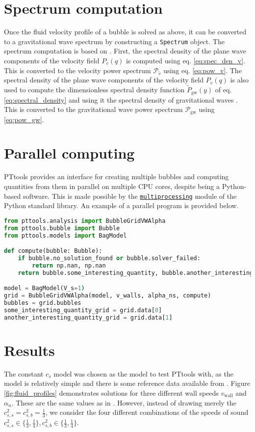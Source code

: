 \section{Spectrum computation}
Once the fluid velocity profile of a bubble is solved as above,
it can be converted to a gravitational wave spectrum by constructing a \verb|Spectrum| object.
The spectrum computation is based on \cite{hindmarsh_gw_pt_2019}.
First, the spectral density of the plane wave components of the velocity field $P_v(q)$ is computed using eq. \eqref{eq:spec_den_v}.
This is converted to the velocity power spectrum $\mathcal{P}_{\tilde{v}}$ using eq. \eqref{eq:pow_v}.
The spectral density of the plane wave components of the velocity field $P_v(q)$ is also used to compute the dimensionless spectral density function $\tilde{P}_{\text{gw}}(y)$ of eq. \eqref{eq:spectral_density} and using it the spectral density of gravitational waves .
This is converted to the gravitational wave power spectrum $\mathcal{P}_{\text{gw}}$ using \eqref{eq:pow_gw}.


\section{Parallel computing}
PTtools provides an interface for creating multiple bubbles and computing quantities from them in parallel on multiple CPU cores,
despite being a Python-based software.
This is made possible by the
\href{https://docs.python.org/3/library/multiprocessing.html}{\texttt{multiprocessing}}
module of the Python standard library.
An example of a parallel program is provided below.

\begin{lstlisting}[language=Python]
from pttools.analysis import BubbleGridVWAlpha
from pttools.bubble import Bubble
from pttools.models import BagModel

def compute(bubble: Bubble):
	if bubble.no_solution_found or bubble.solver_failed:
		return np.nan, np.nan
	return bubble.some_interesting_quantity, bubble.another_interesting_quantity

model = BagModel(V_s=1)
grid = BubbleGridVWAlpha(model, v_walls, alpha_ns, compute)
bubbles = grid.bubbles
some_interesting_quantity_grid = grid.data[0]
another_interesting_quantity_grid = grid.data[1]
\end{lstlisting}


\section{Results}
The constant $c_s$ model was chosen as the model to test PTtools with, as the model is relatively simple and there is some reference data available from \cites{giese_2020}{giese_2021}.
Figure \ref{fig:fluid_profiles} demonstrates solutions for three different wall speeds $v_\text{wall}$ and $\alpha_n$.
These are the same values as in \cite[fig. 10]{hindmarsh_gw_pt_2019}.
However, instead of drawing merely the $c_{s,s}^2 = c_{s,b}^2 = \frac{1}{3}$,
we consider the four different combinations of the speeds of sound
$c_{s,s}^2 \in \{ \frac{1}{3}, \frac{1}{4} \}, c_{s,b}^2 \in \{ \frac{1}{3}, \frac{1}{4} \}$.

